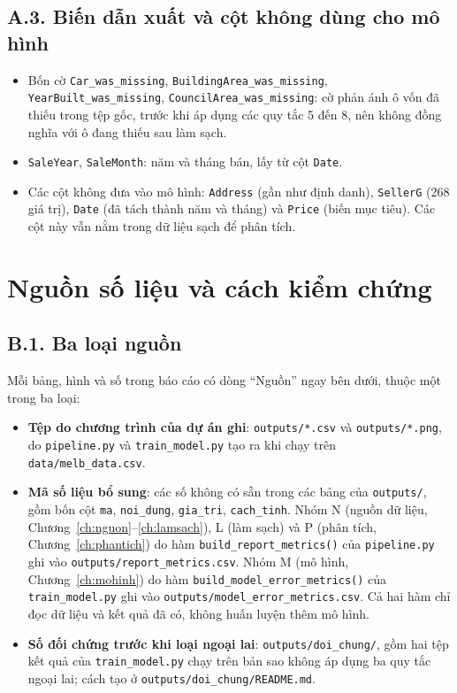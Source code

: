 \section*{A.3. Biến dẫn xuất và cột không dùng cho mô hình}
\begin{itemize}[nosep]
  \item Bốn cờ \texttt{Car\_was\_missing}, \texttt{BuildingArea\_was\_missing}, \texttt{YearBuilt\_was\_missing}, \texttt{CouncilArea\_was\_missing}: cờ phản ánh ô vốn đã thiếu trong tệp gốc, trước khi áp dụng các quy tắc 5 đến 8, nên không đồng nghĩa với ô đang thiếu sau làm sạch.
  \item \texttt{SaleYear}, \texttt{SaleMonth}: năm và tháng bán, lấy từ cột \texttt{Date}.
  \item Các cột không đưa vào mô hình: \texttt{Address} (gần như định danh), \texttt{SellerG} (268 giá trị), \texttt{Date} (đã tách thành năm và tháng) và \texttt{Price} (biến mục tiêu). Các cột này vẫn nằm trong dữ liệu sạch để phân tích.
\end{itemize}


\chapter{Nguồn số liệu và cách kiểm chứng}\label{pl:nguon}

\section*{B.1. Ba loại nguồn}
Mỗi bảng, hình và số trong báo cáo có dòng ``Nguồn'' ngay bên dưới, thuộc một trong ba loại:
\begin{itemize}[nosep]
  \item \textbf{Tệp do chương trình của dự án ghi}: \texttt{outputs/*.csv} và \texttt{outputs/*.png}, do \texttt{pipeline.py} và \texttt{train\_model.py} tạo ra khi chạy trên \texttt{data/melb\_data.csv}.
  \item \textbf{Mã số liệu bổ sung}: các số không có sẵn trong các bảng của \texttt{outputs/}, gồm bốn cột \texttt{ma}, \texttt{noi\_dung}, \texttt{gia\_tri}, \texttt{cach\_tinh}. Nhóm N (nguồn dữ liệu, Chương~\ref{ch:nguon}--\ref{ch:lamsach}), L (làm sạch) và P (phân tích, Chương~\ref{ch:phantich}) do hàm \texttt{build\_report\_metrics()} của \texttt{pipeline.py} ghi vào \texttt{outputs/report\_metrics.csv}. Nhóm M (mô hình, Chương~\ref{ch:mohinh}) do hàm \texttt{build\_model\_error\_metrics()} của \texttt{train\_model.py} ghi vào \texttt{outputs/model\_error\_metrics.csv}. Cả hai hàm chỉ đọc dữ liệu và kết quả đã có, không huấn luyện thêm mô hình.
  \item \textbf{Số đối chứng trước khi loại ngoại lai}: \texttt{outputs/doi\_chung/}, gồm hai tệp kết quả của \texttt{train\_model.py} chạy trên bản sao không áp dụng ba quy tắc ngoại lai; cách tạo ở \texttt{outputs/doi\_chung/README.md}.
\end{itemize}

